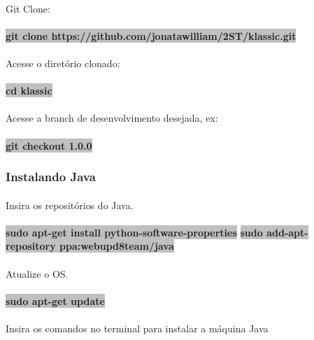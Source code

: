 \documentclass[	DIV=calc,%
							paper=a4,%
							fontsize=12pt,%
							onecolumn]{scrartcl}	 					%
\begin{document}
\paragraph{}
Git Clone:
\paragraph{}
\textbf{\colorbox{Silver}{git clone https://github.com/jonatawilliam/2ST/klassic.git}}
\paragraph{}
Acesse o diretório clonado:
\paragraph{}
\textbf{\colorbox{Silver}{cd klassic}}
\paragraph{}
Acesse a branch de desenvolvimento desejada, ex:
\paragraph{}
\textbf{\colorbox{Silver}{git checkout 1.0.0}}

\subsubsection{Instalando Java}
\paragraph{}
Insira os repositórios do Java.
\paragraph{}
\textbf{\colorbox{Silver}{sudo apt-get install python-software-properties}}
\textbf{\colorbox{Silver}{sudo add-apt-repository ppa:webupd8team/java}}
\paragraph{}
Atualize o OS.
\paragraph{}
\textbf{\colorbox{Silver}{sudo apt-get update}}
\paragraph{}
Insira os comandos no terminal para instalar a máquina Java
\end{document}
